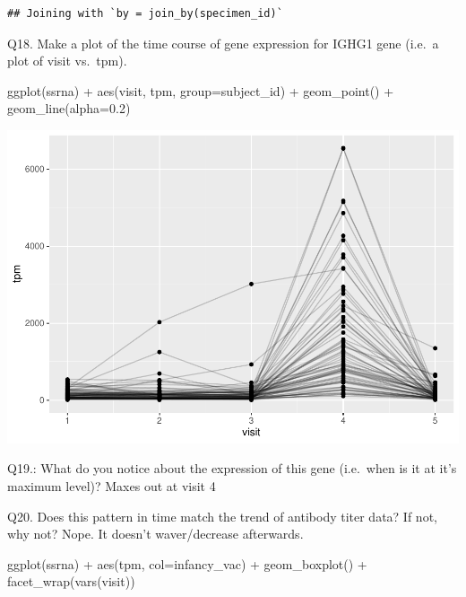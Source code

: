 \documentclass[
]{article}
\newenvironment{Shaded}{\begin{snugshade}}{\end{snugshade}}
\newcommand{\AttributeTok}[1]{\textcolor[rgb]{0.77,0.63,0.00}{#1}}
\newcommand{\FloatTok}[1]{\textcolor[rgb]{0.00,0.00,0.81}{#1}}
\newcommand{\FunctionTok}[1]{\textcolor[rgb]{0.00,0.00,0.00}{#1}}
\newcommand{\NormalTok}[1]{#1}
\newcommand{\SpecialCharTok}[1]{\textcolor[rgb]{0.00,0.00,0.00}{#1}}
\begin{document}
\begin{verbatim}
## Joining with `by = join_by(specimen_id)`
\end{verbatim}

Q18. Make a plot of the time course of gene expression for IGHG1 gene
(i.e.~a plot of visit vs.~tpm).

\begin{Shaded}
\begin{Highlighting}[]
\FunctionTok{ggplot}\NormalTok{(ssrna) }\SpecialCharTok{+}
  \FunctionTok{aes}\NormalTok{(visit, tpm, }\AttributeTok{group=}\NormalTok{subject\_id) }\SpecialCharTok{+}
  \FunctionTok{geom\_point}\NormalTok{() }\SpecialCharTok{+}
  \FunctionTok{geom\_line}\NormalTok{(}\AttributeTok{alpha=}\FloatTok{0.2}\NormalTok{)}
\end{Highlighting}
\end{Shaded}

\includegraphics{lab-19-143_files/figure-latex/unnamed-chunk-29-1.pdf}

Q19.: What do you notice about the expression of this gene (i.e.~when is
it at it's maximum level)? Maxes out at visit 4

Q20. Does this pattern in time match the trend of antibody titer data?
If not, why not? Nope. It doesn't waver/decrease afterwards.

\begin{Shaded}
\begin{Highlighting}[]
\FunctionTok{ggplot}\NormalTok{(ssrna) }\SpecialCharTok{+}
  \FunctionTok{aes}\NormalTok{(tpm, }\AttributeTok{col=}\NormalTok{infancy\_vac) }\SpecialCharTok{+}
  \FunctionTok{geom\_boxplot}\NormalTok{() }\SpecialCharTok{+}
  \FunctionTok{facet\_wrap}\NormalTok{(}\FunctionTok{vars}\NormalTok{(visit))}
\end{Highlighting}
\end{Shaded}
\end{document}
